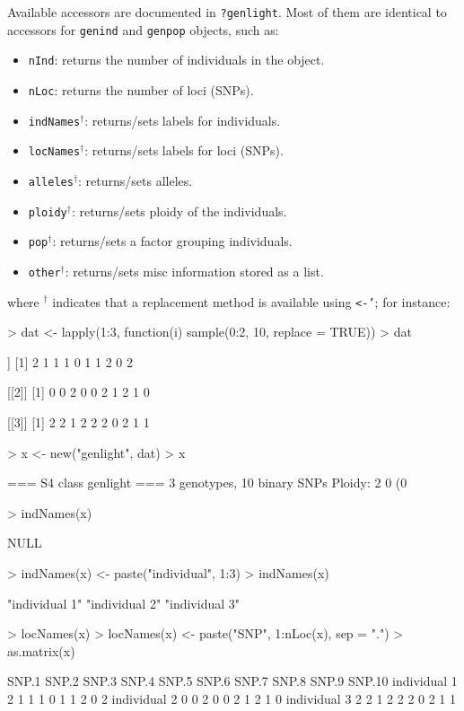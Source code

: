 \documentclass{article}
\newcommand{\code}[1]{{{\tt #1}}}
\begin{document}
Available accessors are documented in \code{?genlight}.
Most of them are identical to accessors for \texttt{genind} and \texttt{genpop} objects, such as:
\begin{itemize}
  \item \texttt{nInd}: returns the number of individuals in the object.
  \item \texttt{nLoc}: returns the number of loci (SNPs).
  \item \texttt{indNames}$^{\dagger}$: returns/sets labels for individuals.
  \item \texttt{locNames}$^{\dagger}$: returns/sets labels for loci (SNPs).
  \item \texttt{alleles}$^{\dagger}$: returns/sets alleles.
  \item \texttt{ploidy}$^{\dagger}$: returns/sets ploidy of the individuals.
  \item \texttt{pop}$^{\dagger}$: returns/sets a factor grouping individuals.
  \item \texttt{other}$^{\dagger}$: returns/sets misc information stored as a list.
\end{itemize}
where $^{\dagger}$ indicates that a replacement method is available using \texttt{<-'}; for instance:
\begin{Schunk}
\begin{Sinput}
> dat <- lapply(1:3, function(i) sample(0:2, 10, replace = TRUE))
> dat
\end{Sinput}
\begin{Soutput}
[[1]]
 [1] 2 1 1 1 0 1 1 2 0 2

[[2]]
 [1] 0 0 2 0 0 2 1 2 1 0

[[3]]
 [1] 2 2 1 2 2 2 0 2 1 1
\end{Soutput}
\begin{Sinput}
> x <- new("genlight", dat)
> x
\end{Sinput}
\begin{Soutput}
 === S4 class genlight ===
 3 genotypes,  10 binary SNPs
 Ploidy: 2
 0 (0 %
\end{Soutput}
\begin{Sinput}
> indNames(x)
\end{Sinput}
\begin{Soutput}
NULL
\end{Soutput}
\begin{Sinput}
> indNames(x) <- paste("individual", 1:3)
> indNames(x)
\end{Sinput}
\begin{Soutput}
[1] "individual 1" "individual 2" "individual 3"
\end{Soutput}
\begin{Sinput}
> locNames(x)
> locNames(x) <- paste("SNP", 1:nLoc(x), sep = ".")
> as.matrix(x)
\end{Sinput}
\begin{Soutput}
             SNP.1 SNP.2 SNP.3 SNP.4 SNP.5 SNP.6 SNP.7 SNP.8 SNP.9 SNP.10
individual 1     2     1     1     1     0     1     1     2     0      2
individual 2     0     0     2     0     0     2     1     2     1      0
individual 3     2     2     1     2     2     2     0     2     1      1
\end{Soutput}
\end{Schunk}
\end{document}
